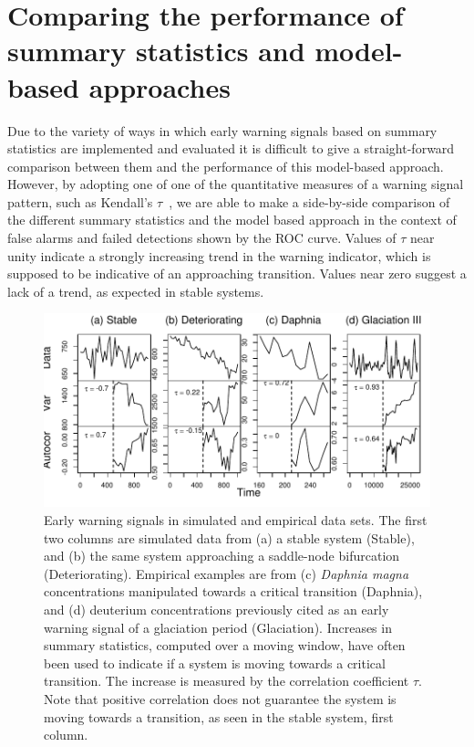 \documentclass[authoryear,review,11pt]{elsarticle}
\begin{document}
\section{Comparing the performance of summary statistics and model-based approaches}  
Due to the variety of ways in which early warning signals based on summary statistics are implemented and evaluated
it is difficult to give a straight-forward comparison between them and the performance of this model-based approach.
However, by adopting one of one of the quantitative measures of a warning signal pattern,
such as Kendall's $\tau$~\citep{Dakos2008, Dakos2011, Dakos2009}, 
we are able to make a side-by-side comparison of the different summary statistics and the model based approach in the
context of false alarms and failed detections shown by the ROC curve.  
Values of $\tau$ near unity indicate a strongly increasing trend in the warning indicator, 
which is supposed to be indicative of an approaching transition.  
Values near zero suggest a lack of a trend, as expected in stable systems.

\begin{figure}
   \begin{center}
     \includegraphics[width=\linewidth]{figures/Fig2}
     \caption{Early warning signals in simulated and empirical data sets.  The first two columns are simulated data from (a) a stable system (Stable), and (b) the same system approaching a saddle-node bifurcation (Deteriorating).  Empirical examples are from (c) \emph{Daphnia magna} concentrations manipulated towards a critical transition (Daphnia), and (d) deuterium concentrations previously cited as an early warning signal of a glaciation period (Glaciation). Increases in summary statistics, computed over a moving window, have often been used to indicate if a system is moving towards a critical transition.  The increase is measured by the correlation coefficient $\tau$.  Note that positive correlation does not guarantee the system is moving towards a transition, as seen in the stable system, first column.}
     \label{fig:summary_stats}
  \end{center}
 \end{figure}
\end{document}
